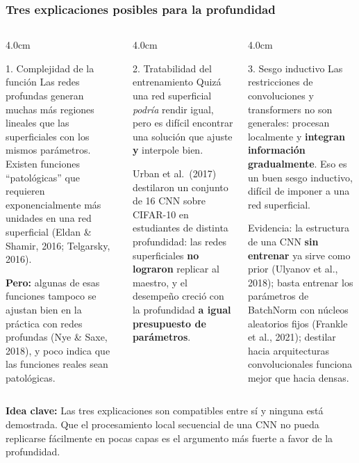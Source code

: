 \documentclass[aspectratio=169, 10pt]{beamer}
\newcommand{\idea}[1]{%
	\begin{tcolorbox}[colback=AccentGreen!6, colframe=AccentGreen, arc=3pt,
		width=\textwidth, boxsep=1pt, left=5pt, right=5pt, top=2pt, bottom=2pt,
		fontupper=\small]
		\RaggedRight\textbf{Idea clave:} #1
	\end{tcolorbox}
}
\begin{document}
\begin{frame}
\frametitle{Tres explicaciones posibles para la profundidad}
\scriptsize %
\begin{columns}[T]
\begin{column}{4.0cm}
\begin{block}{1. Complejidad de la función}
Las redes profundas generan muchas m\'as regiones lineales que las superficiales con los mismos par\'ametros. Existen funciones ``patol\'ogicas'' que requieren exponencialmente m\'as unidades en una red superficial (Eldan \& Shamir, 2016; Telgarsky, 2016).
\vspace{0.3em}

\textcolor{StanfordRed}{\textbf{Pero:}} algunas de esas funciones tampoco se ajustan bien en la pr\'actica con redes profundas (Nye \& Saxe, 2018), y poco indica que las funciones reales sean patol\'ogicas.
\end{block}
\end{column}
\begin{column}{4.0cm}
\begin{block}{2. Tratabilidad del entrenamiento}
Quiz\'a una red superficial \emph{podr\'ia} rendir igual, pero es dif\'icil encontrar una soluci\'on que ajuste \textbf{y} interpole bien.
\vspace{0.3em}

Urban et al.\ (2017) destilaron un conjunto de 16 CNN sobre CIFAR-10 en estudiantes de distinta profundidad: las redes superficiales \textbf{no lograron} replicar al maestro, y el desempe\~no creci\'o con la profundidad \textbf{a igual presupuesto de par\'ametros}.
\end{block}
\end{column}
\begin{column}{4.0cm}
\begin{block}{3. Sesgo inductivo}
Las restricciones de convoluciones y transformers no son generales: procesan localmente y \textbf{integran informaci\'on gradualmente}. Eso es un buen sesgo inductivo, dif\'icil de imponer a una red superficial.
\vspace{0.3em}

Evidencia: la estructura de una CNN \textbf{sin entrenar} ya sirve como prior (Ulyanov et al., 2018); basta entrenar los par\'ametros de BatchNorm con n\'ucleos aleatorios fijos (Frankle et al., 2021); destilar hacia arquitecturas convolucionales funciona mejor que hacia densas.
\end{block}
\end{column}
\end{columns}
\vspace{0.3em}
\idea{Las tres explicaciones son compatibles entre s\'i y ninguna est\'a demostrada. Que el procesamiento local secuencial de una CNN no pueda replicarse f\'acilmente en pocas capas es el argumento m\'as fuerte a favor de la profundidad.}
\end{frame}
\end{document}
